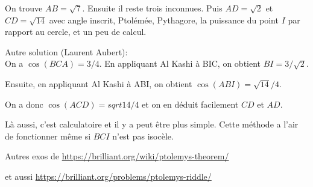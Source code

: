 \begin{exo}
\begin{center}
\end{center}
\begin{sol}
On trouve $AB=\sqrt 7$. Ensuite il reste trois inconnues. Puis $AD=\sqrt 2$ et $CD=\sqrt{14}$ avec angle inscrit, Ptolémée, Pythagore, la puissance du point $I$ par rapport au cercle, et un peu de calcul.

Autre solution (Laurent Aubert):\\

On a $\cos(BCA)=3/4$. En appliquant Al Kashi à BIC, on obtient $BI=3/\sqrt 2$.

Ensuite, en appliquant Al Kashi à ABI, on obtient $\cos(ABI)=\sqrt{14}/4$.

On a donc $\cos(ACD)=sqrt{14}/4$ et on en déduit facilement $CD$ et $AD$.

Là aussi, c'est calculatoire et il y a peut être plus simple. Cette méthode a l'air de fonctionner même si $BCI$ n'est pas isocèle.


\end{sol}
\end{exo}

Autres exos de \url{https://brilliant.org/wiki/ptolemys-theorem/}

et aussi \url{https://brilliant.org/problems/ptolemys-riddle/}





\indications
\correction



